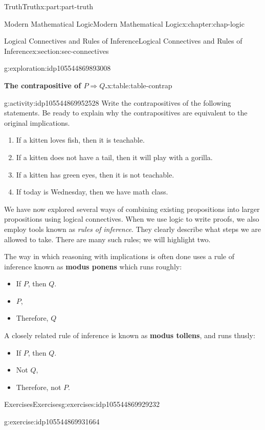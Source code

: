 \documentclass[oneside,10pt,]{book}
\newcommand{\terminology}[1]{\textbf{#1}}
\numberwithin{equation}{section}
\begin{document}
\begin{partptx}{Truth}{}{Truth}{}{}{x:part:part-truth}
\begin{chapterptx}{Modern Mathematical Logic}{}{Modern Mathematical Logic}{}{}{x:chapter:chap-logic}
\begin{sectionptx}{Logical Connectives and Rules of Inference}{}{Logical Connectives and Rules of Inference}{}{}{x:section:sec-connectives}
\begin{exploration}{}{g:exploration:idp105544869893008}
\begin{tableptx}{\textbf{The contrapositive of \(P\Rightarrow Q\).}}{x:table:table-contrap}{}
\end{tableptx}%
\end{exploration}%
\begin{activity}{}{g:activity:idp105544869952528}%
Write the contrapositives of the following statements. Be ready to explain why the contrapositives are equivalent to the original implications.%
%
\begin{enumerate}
\item{}If a kitten loves fish, then it is teachable.%
\item{}If a kitten does not have a tail, then it will play with a gorilla.%
\item{}If a kitten has green eyes, then it is not teachable.%
\item{}If today is Wednesday, then we have math class.%
\end{enumerate}
\end{activity}%
We have now explored several ways of combining existing propositions into larger propositions using logical connectives. When we use logic to write proofs, we also employ tools known as \emph{rules of inference}. They clearly describe what steps we are allowed to take. There are many such rules; we will highlight two.%
\par
The way in which reasoning with implications is often done uses a rule of inference known as \terminology{modus ponens} which runs roughly:%
%
\begin{itemize}[label=\textbullet]
\item{}If \(P\), then \(Q\).%
\item{}\(P\),%
\item{}Therefore, \(Q\)%
\end{itemize}
A closely related rule of inference is known as \terminology{modus tollens}, and runs thusly:%
%
\begin{itemize}[label=\textbullet]
\item{}If \(P\), then \(Q\).%
\item{}Not \(Q\),%
\item{}Therefore, not \(P\).%
\end{itemize}
%
%
\typeout{************************************************}
\typeout{************************************************}
%
\begin{exercises-subsection-numberless}{Exercises}{}{Exercises}{}{}{g:exercises:idp105544869929232}
\begin{divisionexercise}{1}{}{}{g:exercise:idp105544869931664}%
%
\end{divisionexercise}%

\end{exercises-subsection-numberless}
\end{sectionptx}
\end{chapterptx}
\end{partptx}
\end{document}
